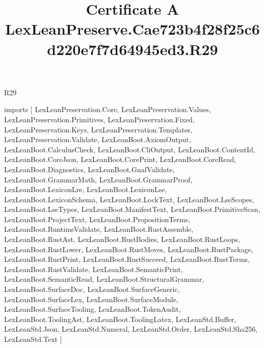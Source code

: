 \begin{lexlean}{R29}
\title{Certificate A LexLeanPreserve.Cae723b4f28f25c6d220e7f7d64945ed3.R29}
\begin{coremodule}
imports [
  LexLeanPreservation.Core,
  LexLeanPreservation.Values,
  LexLeanPreservation.Primitives,
  LexLeanPreservation.Fixed,
  LexLeanPreservation.Keys,
  LexLeanPreservation.Templates,
  LexLeanPreservation.Validate,
  LexLeanBoot.AxiomOutput,
  LexLeanBoot.CalculusCheck,
  LexLeanBoot.CliOutput,
  LexLeanBoot.ContentId,
  LexLeanBoot.CoreJson,
  LexLeanBoot.CorePrint,
  LexLeanBoot.CoreRead,
  LexLeanBoot.Diagnostics,
  LexLeanBoot.GnafValidate,
  LexLeanBoot.GrammarMath,
  LexLeanBoot.GrammarProof,
  LexLeanBoot.LexiconLre,
  LexLeanBoot.LexiconLse,
  LexLeanBoot.LexiconSchema,
  LexLeanBoot.LockText,
  LexLeanBoot.LseScopes,
  LexLeanBoot.LseTypes,
  LexLeanBoot.ManifestText,
  LexLeanBoot.PrimitiveScan,
  LexLeanBoot.ProjectText,
  LexLeanBoot.PropositionTerms,
  LexLeanBoot.RuntimeValidate,
  LexLeanBoot.RustAssemble,
  LexLeanBoot.RustAst,
  LexLeanBoot.RustBodies,
  LexLeanBoot.RustLoops,
  LexLeanBoot.RustLower,
  LexLeanBoot.RustMoves,
  LexLeanBoot.RustPackage,
  LexLeanBoot.RustPrint,
  LexLeanBoot.RustSucceed,
  LexLeanBoot.RustTerms,
  LexLeanBoot.RustValidate,
  LexLeanBoot.SemanticPrint,
  LexLeanBoot.SemanticRead,
  LexLeanBoot.StructuralGrammar,
  LexLeanBoot.SurfaceDoc,
  LexLeanBoot.SurfaceGeneric,
  LexLeanBoot.SurfaceLex,
  LexLeanBoot.SurfaceModule,
  LexLeanBoot.SurfaceTooling,
  LexLeanBoot.TokenAudit,
  LexLeanBoot.ToolingAst,
  LexLeanBoot.ToolingLatex,
  LexLeanStd.Buffer,
  LexLeanStd.Json,
  LexLeanStd.Numeral,
  LexLeanStd.Order,
  LexLeanStd.Sha256,
  LexLeanStd.Text
]


\end{coremodule}
\end{lexlean}
